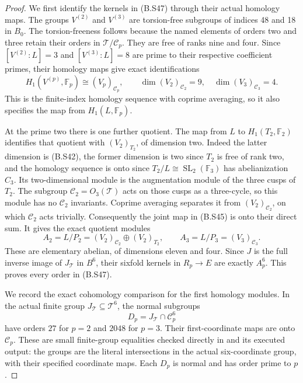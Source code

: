 \begin{proof}
We first identify the kernels in (B.S47) through their
actual homology maps.  The groups $V^{(2)}$ and
$V^{(3)}$ are torsion-free subgroups of indices 48 and
18 in $B_0$.  The torsion-freeness follows because the
named elements of orders two and three retain their
orders in $\mathcal T/\mathcal C_p$.  They are free of ranks
nine and four.  Since $[V^{(2)}:L]=3$ and
$[V^{(3)}:L]=8$ are prime to their respective coefficient
primes, their homology maps give exact identifications
\[
 H_1(V^{(p)},\mathbb F_p)
                    \cong (V_p)_{\mathcal C_p},
       \qquad \dim (V_2)_{\mathcal C_2}=9,
       \quad \dim (V_3)_{\mathcal C_3}=4.                              \tag{B.S49}
\]
This is the finite-index homology sequence with
coprime averaging, so it also specifies the map from
$H_1(L,\mathbb F_p)$.

At the prime two there is one further quotient.
The map from $L$ to $H_1(T_2,\mathbb F_2)$ identifies
that quotient with $(V_2)_{T_2}$, of dimension two.
Indeed the latter dimension is (B.S42), the former
dimension is two since $T_2$ is free of rank two,
and the homology sequence is onto since
$T_2/L\cong\operatorname{SL}_2(\mathbb F_3)$ has
abelianization $C_3$.  Its two-dimensional module is
the augmentation module of the three cusps of $T_2$.
The subgroup $\mathcal C_2=O_3(\mathcal T)$ acts on those
cusps as a three-cycle, so this module has no
$\mathcal C_2$ invariants.  Coprime averaging separates it
from $(V_2)_{\mathcal C_2}$, on which $\mathcal C_2$ acts trivially.
Consequently the joint map in (B.S45) is onto their
direct sum.  It gives the exact quotient modules
\[
 A_2=L/P_2=(V_2)_{\mathcal C_2}\oplus(V_2)_{T_2},
                 \qquad A_3=L/P_3=(V_3)_{\mathcal C_3}.                \tag{B.S50}
\]
These are elementary abelian, of dimensions eleven
and four.  Since $J$ is the full inverse image of
$J_{\mathcal T}$ in $B^6$, their sixfold kernels in
$R_p\to E$ are exactly $A_p^6$.  This proves every
order in (B.S47).

We record the exact cohomology comparison for the
first homology modules.  In the actual finite group
$J_{\mathcal T}\subseteq\mathcal T^6$, the normal
subgroups
\[
 D_p=J_{\mathcal T}\cap \mathcal C_p^6
\]
have orders $27$ for $p=2$ and $2048$ for $p=3$.
Their first-coordinate maps are onto $\mathcal C_p$.
These are small finite-group equalities checked
directly in
and its executed output: the groups are the literal
intersections in the actual six-coordinate group,
with their specified coordinate maps.
Each $D_p$ is normal and has order prime to $p$.


\end{proof}
